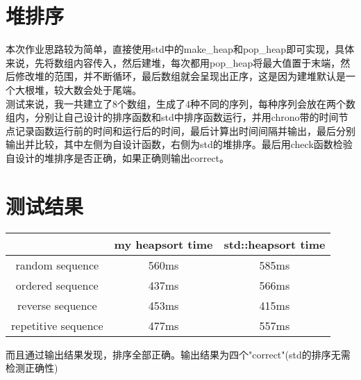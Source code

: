\documentclass[UTF8]{ctexart}
\begin{document}
\pagestyle{fancy}
\fancyhead{}

\section{堆排序}
本次作业思路较为简单，直接使用std中的make\_heap和pop\_heap即可实现，具体来说，先将数组内容传入，然后建堆，每次都用pop\_heap将最大值置于末端，然后修改堆的范围，并不断循环，最后数组就会呈现出正序，这是因为建堆默认是一个大根堆，较大数会处于尾端。\\
\indent 测试来说，我一共建立了8个数组，生成了4种不同的序列，每种序列会放在两个数组内，分别让自己设计的排序函数和std中排序函数运行，并用chrono带的时间节点记录函数运行前的时间和运行后的时间，最后计算出时间间隔并输出，最后分别输出并比较，其中左侧为自设计函数，右侧为std的堆排序。最后用check函数检验自设计的堆排序是否正确，如果正确则输出correct。

\section{测试结果}
\begin{center}
\begin{tabular}{|c|c|c|}
\hline
 & my heapsort time & std::heapsort time \\
\hline
random sequence & 560ms & 585ms \\
\hline
ordered sequence & 437ms & 566ms \\
\hline
reverse sequence & 453ms & 415ms \\
\hline
repetitive sequence & 477ms & 557ms \\
\hline
\end{tabular}
\end{center}
\indent 而且通过输出结果发现，排序全部正确。输出结果为四个"correct"(std的排序无需检测正确性)
\end{document}
